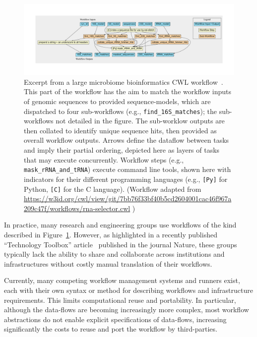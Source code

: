\documentclass[sigconf,revew,screen,timestamp,nonacm]{acmart}
\begin{document}
\begin{figure}
  \centering
 \includegraphics[width=\textwidth]{figure1}
  \caption{Excerpt from a large microbiome bioinformatics CWL workflow~\cite{mitchell_mgnify_2020}. This part of the workflow has the aim to match the workflow inputs of genomic sequences to provided sequence-models, which are dispatched to four sub-workflows (e.g., \texttt{find\_16S\_matches}); the sub-workflows not detailed in the figure. The sub-worklow outputs are then collated to identify unique sequence hits, then provided as overall workflow outputs. Arrows define the dataflow between tasks and imply their partial ordering, depicted here as layers of tasks that may execute concurrently.  Workflow steps (e.g., \texttt{mask\_rRNA\_and\_tRNA}) execute command line tools, shown here with indicators for their different programming languages (e.g., \texttt{[Py]} for Python, \texttt{[C]} for the C language). (Workflow adapted from \url{https://w3id.org/cwl/view/git/7bb76f33bf40b5cd2604001cac46f967a209c47f/workflows/rna-selector.cwl} )}
  \label{fig:sample_workflow}
 \end{figure}
 
In practice, many research and engineering groups use workflows of the kind described in Figure~\ref{fig:sample_workflow}. However, as highlighted in a recently published ``Technology Toolbox'' article~\cite{perkel_workflow_2019} published in the journal Nature, these groups typically lack the ability to share and collaborate across institutions and infrastructures without costly manual translation of their workflows.

Currently, many competing workflow management systems and runners exist, each with their own syntax or method for describing workflows and infrastructure requirements. This limits computational reuse and portability. In particular, although the data-flows are becoming increasingly more complex, most workflow abstractions do not enable explicit specifications of data-flows, increasing significantly the costs to reuse and port the workflow by third-parties.
\end{document}
